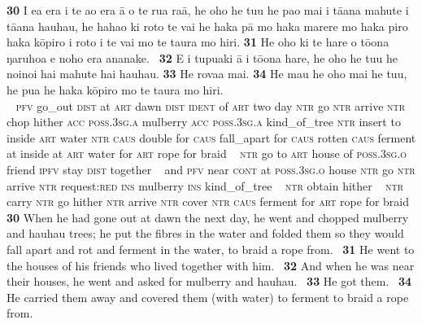 \newpage 
\gll
\textbf{\textup{30}} I e{\ꞌ}a era {\ꞌ}i te {\ꞌ}ao era {\ꞌ}ā o te rua ra{\ꞌ}ā, he oho he tu{\ꞌ}u he pa{\ꞌ}o mai i tā{\ꞌ}ana mahute i tā{\ꞌ}ana hauhau, he haha{\ꞌ}o ki roto te vai he haka pā mo haka marere mo haka piro haka kōpiro {\ꞌ}i roto i te vai mo te taura mo hiri. \textbf{\textup{31}} He oho ki te hare o tō{\ꞌ}ona ŋaruhoa e noho era ananake. ~\textbf{\textup{32}} {\ꞌ}E i tupu{\ꞌ}aki {\ꞌ}ā {\ꞌ}i tō{\ꞌ}ona hare, he oho he tu{\ꞌ}u he no{\ꞌ}ino{\ꞌ}i hai mahute hai hauhau. \textbf{\textup{33}} He rova{\ꞌ}a mai. \textbf{34} He ma{\ꞌ}u he oho mai he tu{\ꞌ}u, he pu{\ꞌ}a he haka kōpiro mo te taura mo hiri.\\
~ \textsc{pfv} go\_out \textsc{dist} at \textsc{art} dawn \textsc{dist} \textsc{ident} of \textsc{art} two day \textsc{ntr} go \textsc{ntr} arrive \textsc{ntr} chop hither \textsc{acc} \textsc{poss.3sg.a} mulberry \textsc{acc} \textsc{poss.3sg.a} kind\_of\_tree \textsc{ntr} insert to inside \textsc{art} water \textsc{ntr} \textsc{caus} double for \textsc{caus} fall\_apart for \textsc{caus} rotten \textsc{caus} ferment at inside at \textsc{art} water for \textsc{art} rope for braid ~ \textsc{ntr} go to \textsc{art} house of \textsc{poss.3sg.o} friend \textsc{ipfv} stay \textsc{dist} together ~ and \textsc{pfv} near \textsc{cont} at \textsc{poss.3sg.o} house \textsc{ntr} go \textsc{ntr} arrive \textsc{ntr} request:\textsc{red} \textsc{ins} mulberry \textsc{ins} kind\_of\_tree ~ \textsc{ntr} obtain hither ~ \textsc{ntr} carry \textsc{ntr} go hither \textsc{ntr} arrive \textsc{ntr} cover \textsc{ntr} \textsc{caus} ferment for \textsc{art} rope for braid\\

\medskip\glt
\textbf{\textup{30}} When he had gone out at dawn the next day, he went and chopped mulberry and hauhau trees; he put the fibres in the water and folded them so they would fall apart and rot and ferment in the water, to braid a rope from. ~\textbf{\textup{31}} He went to the houses of his friends who lived together with him. ~\textbf{\textup{32}} And when he was near their houses, he went and asked for mulberry and hauhau. ~\textbf{\textup{33}} He got them. ~\textbf{\textup{34}} He carried them away and covered them (with water) to ferment to braid a rope from.


~

